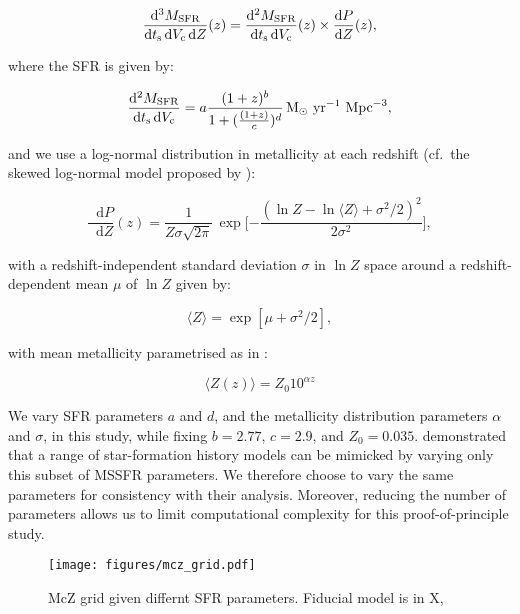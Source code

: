 \documentclass[twocolumn]{aastex631}
\newcommand*\diff{\mathop{}\!\mathrm{d}}
\newcommand{\MSFR}{\ensuremath{{M}_{\rm{SFR}}}\xspace}
\newcommand{\ts}{\ensuremath{{t}_{\rm{s}}}\xspace}
\newcommand{\Vc}{\ensuremath{{V}_{\rm{c}}}\xspace}
\newcommand{\resp}[1]{#1}
\begin{document}
\begin{equation}
  \frac{\diff^3 \MSFR}{\diff \ts \diff \Vc \diff Z}(z) =
  \frac{\diff^2 \MSFR}{\diff \ts \diff \Vc }(z)
  \times
  \frac{\diff P }{\diff Z}(z),
\end{equation}

\noindent
where the SFR is given by:

\begin{equation}
  \frac{\diff^2 \MSFR}{\diff \ts \diff \Vc} =
  a\frac{(1 + z)^b}{1 + (\frac{(1 + z)}{c})^d}\,
  \mathrm{M}_\odot\ \mathrm{yr}^{-1}\ \mathrm{Mpc}^{-3},
\end{equation}

\bigskip\noindent
and we use a log-normal distribution in metallicity at each redshift (cf.~the skewed log-normal model proposed by \citet{vanSon_2022}):

\begin{equation}
  \frac{\diff P }{\diff Z}(z) =
  \frac{1}{Z\sigma\sqrt{2\pi}}\, \exp\bigg[{-\frac{(\ln Z-\ln \langle Z \rangle +\sigma^2/2)^2}{2\sigma^2}}\bigg],
\end{equation}

\bigskip\noindent
with a redshift-independent standard deviation $\sigma$ in $\ln Z$ space around a redshift-dependent mean $\mu$ of $\ln Z$ given by:

\begin{equation}
  \langle Z \rangle =
  \exp[\mu + \sigma^2/2],
\end{equation}

\bigskip\noindent
with mean metallicity parametrised as in \citet{Langer_2006}:

\begin{equation}
  \langle Z(z) \rangle =
  Z_{0}10^{\alpha{z}}
\end{equation}

\bigskip\noindent
We vary SFR parameters $a$ and $d$, and the metallicity distribution parameters $\alpha$ and $\sigma$, in this study, while fixing $b=2.77$, $c=2.9$, and $Z_0=0.035$.  \resp{\citet{Neijssel_2019} demonstrated that a range of star-formation history models can be mimicked by varying only this subset of \ac{MSSFR} parameters.  We therefore choose to vary the same parameters for consistency with their analysis.  Moreover, reducing the number of parameters allows us to limit computational complexity for this proof-of-principle study.}


\begin{figure}[ht!]
    \begin{centering}
        \texttt{[image: figures/mcz\_grid.pdf]}
        \caption{
            McZ grid given differnt SFR parameters. Fiducial model is in X, 
        }
        \label{fig:mcz_grid}
    \end{centering}
\end{figure}
\end{document}
